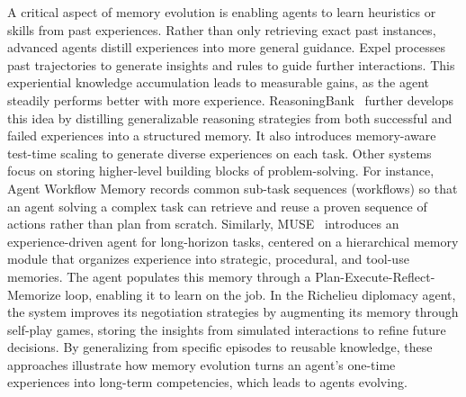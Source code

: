 \documentclass[10pt]{article} %
\begin{document}
A critical aspect of memory evolution is enabling agents to learn heuristics or skills from past experiences. Rather than only retrieving exact past instances, advanced agents distill experiences into more general guidance\citep{zhao2024expel, fu2024autoguide}. Expel\citep{zhao2024expel} processes past trajectories to generate insights and rules to guide further interactions. This experiential knowledge accumulation leads to measurable gains, as the agent steadily performs better with more experience. ReasoningBank~\citep{ouyang2025reasoningbank} further develops this idea by distilling generalizable reasoning strategies from both successful and failed experiences into a structured memory. It also introduces memory-aware test-time scaling to generate diverse experiences on each task.
Other systems focus on storing higher-level building blocks of problem-solving. For instance, Agent Workflow Memory\citep{wang2024agent} records common sub-task sequences (workflows) so that an agent solving a complex task can retrieve and reuse a proven sequence of actions rather than plan from scratch. Similarly, MUSE~\citep{yang2025learningonthejob} introduces an experience-driven agent for long-horizon tasks, centered on a hierarchical memory module that organizes experience into strategic, procedural, and tool-use memories. The agent populates this memory through a Plan-Execute-Reflect-Memorize loop, enabling it to learn on the job.
In the Richelieu diplomacy agent, the system improves its negotiation strategies by augmenting its memory through self-play games, storing the insights from simulated interactions to refine future decisions\citep{guan2024richelieu}.
By generalizing from specific episodes to reusable knowledge, these approaches illustrate how memory evolution turns an agent’s one-time experiences into long-term competencies, which leads to agents evolving.
\end{document}
